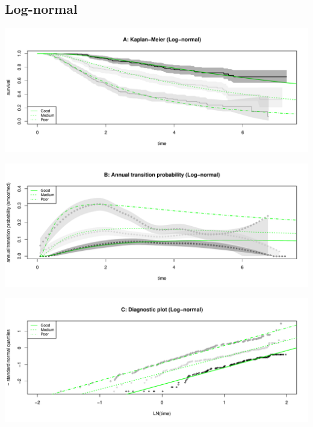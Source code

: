 \documentclass[]{article}
\begin{document}
\newpage 

\subsection{Log-normal}\label{log-normal}

\begin{flushleft}\includegraphics[height=0.25\textheight]{Images/lnorm-1} \end{flushleft}

\begin{flushleft}\includegraphics[height=0.25\textheight]{Images/lnorm-2} \end{flushleft}

\begin{flushleft}\includegraphics[height=0.25\textheight]{Images/lnorm-3} \end{flushleft}

\newpage 
\end{document}
